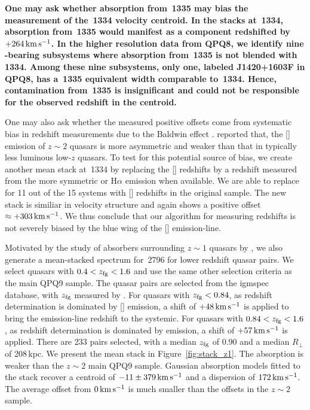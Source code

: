 \documentclass[iop]{emulateapj}
\begin{document}
{\bf One may ask whether absorption from \,1335 may bias the measurement of the
\,1334 velocity centroid. In the stacks at \,1334, absorption from \,1335
would manifest as a component redshifted by $+264\,{\rm km\,s^{-1}}$.
In the higher resolution data from QPQ8, we identify nine -bearing subsystems where absorption
from \,1335 is not blended with \,1334. Among these nine subsystems, only one,
labeled J1420+1603F in QPQ8, has a \,1335 equivalent width comparable to \,1334.
Hence, contamination from \,1335 is insignificant and could not be responsible for the
observed redshift in the centroid.}

One may also ask whether the measured positive offsets come from systematic bias in redshift
measurements due to the Baldwin effect \citep{Baldwin77}. \cite{Shen16} reported that, the
[] emission of $z\sim2$ quasars is more asymmetric and weaker than that in typically
less luminous low-$z$ quasars. To test for this potential source of bias, we create another mean
stack at \,1334 by replacing the [] redshifts by a redshift measured from the
more symmetric  or H$\alpha$ emission when available. We are able to replace for 11 out
of the 15 systems with [] redshifts in the original sample. The new stack is similiar in
velocity structure and again shows a positive offset $\approx+303\,{\rm km\,s^{-1}}$. We thus
conclude that our algorithm for measuring redshifts is not severely biased by the blue wing of the
[] emission-line.

Motivated by the study of  absorbers surrounding $z\sim1$ quasars by \cite{Johnson+15},
we also generate a mean-stacked spectrum for \,2796 for lower redshift quasar pairs.
We select quasars with $0.4<z_{\rm fg}<1.6$ and use the same other selection criteria as the main
QPQ9 sample. The quasar pairs are selected from the igmspec database, with $z_{\rm fg}$ measured
by \cite{HewettWild10}. For quasars with $z_{\rm fg}<0.84$, as redshift determination is dominated
by [] emission, a shift of $+48\,{\rm km\,s^{-1}}$ is applied to bring the emission-line
redshift to the systemic. For quasars with $0.84<z_{\rm fg}<1.6$, as redshift determination is
dominated by  emission, a shift of $+57\,{\rm km\,s^{-1}}$ is applied. There are 233
pairs selected, with a median $z_{\rm fg}$ of 0.90 and a median $R_\perp$ of 208\,kpc. We present
the mean stack in Figure~\ref{fig:stack_z1}. The absorption is weaker than the $z\sim2$ main QPQ9
sample. Gaussian absorption models fitted to the stack recover a centroid of
$-11\pm379\,{\rm km\,s^{-1}}$ and a dispersion of $172\,{\rm km\,s^{-1}}$. The average offset
from $0\,{\rm km\,s^{-1}}$ is much smaller than the offsets in the $z\sim2$ sample.
\end{document}
